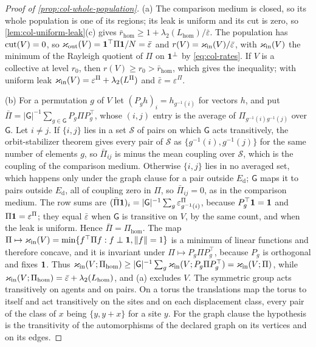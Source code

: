 \begin{proof}[Proof of \cref{prop:col-whole-population}]
(a) The comparison medium is closed, so its whole population is one of its regions; its leak is uniform and its cut is zero, so \cref{lem:col-uniform-leak}(c) gives $\bar r_{\mathrm{hom}}\ge1+\lambda_2(L_{\mathrm{hom}})/\bar\varepsilon$. The population has $\operatorname{cut}(V)=0$, so $\varkappa_{\mathrm{out}}(V)=\mathbf{1}^\top\Pi\mathbf{1}/N=\bar\varepsilon$ and $r(V)=\varkappa_{\mathrm{in}}(V)/\bar\varepsilon$, with $\varkappa_{\mathrm{in}}(V)$ the minimum of the Rayleigh quotient of $\Pi$ on $\mathbf{1}^\perp$ by \eqref{eq:col-rates}. If $V$ is a collective at level $r_0$, then $r(V)\ge r_0>\bar r_{\mathrm{hom}}$, which gives the inequality; with uniform leak $\varkappa_{\mathrm{in}}(V)=\varepsilon^\Pi+\lambda_2(L^\Pi)$ and $\bar\varepsilon=\varepsilon^\Pi$.

(b) For a permutation $g$ of $V$ let $(P_gh)_i=h_{g^{-1}(i)}$ for vectors $h$, and put $\bar\Pi=|\mathsf G|^{-1}\sum_{g\in\mathsf G}P_g\Pi P_g^\top$, whose $(i,j)$ entry is the average of $\Pi_{g^{-1}(i)g^{-1}(j)}$ over $\mathsf G$. Let $i\neq j$. If $\{i,j\}$ lies in a set $\mathcal S$ of pairs on which $\mathsf G$ acts transitively, the orbit-stabilizer theorem gives every pair of $\mathcal S$ as $\{g^{-1}(i),g^{-1}(j)\}$ for the same number of elements $g$, so $\bar\Pi_{ij}$ is minus the mean coupling over $\mathcal S$, which is the coupling of the comparison medium. Otherwise $\{i,j\}$ lies in no averaged set, which happens only under the graph clause for a pair outside $E_{\mathrm d}$; $\mathsf G$ maps it to pairs outside $E_{\mathrm d}$, all of coupling zero in $\Pi$, so $\bar\Pi_{ij}=0$, as in the comparison medium. The row sums are $(\bar\Pi\mathbf{1})_i=|\mathsf G|^{-1}\sum_g\varepsilon^\Pi_{g^{-1}(i)}$, because $P_g^\top\mathbf{1}=\mathbf{1}$ and $\Pi\mathbf{1}=\varepsilon^\Pi$; they equal $\bar\varepsilon$ when $\mathsf G$ is transitive on $V$, by the same count, and when the leak is uniform. Hence $\bar\Pi=\Pi_{\mathrm{hom}}$. The map $\Pi\mapsto\varkappa_{\mathrm{in}}(V)=\min\{f^\top\Pi f:f\perp\mathbf{1},\Vert f\Vert=1\}$ is a minimum of linear functions and therefore concave, and it is invariant under $\Pi\mapsto P_g\Pi P_g^\top$, because $P_g$ is orthogonal and fixes $\mathbf{1}$. Thus $\varkappa_{\mathrm{in}}(V;\Pi_{\mathrm{hom}})\ge|\mathsf G|^{-1}\sum_g\varkappa_{\mathrm{in}}(V;P_g\Pi P_g^\top)=\varkappa_{\mathrm{in}}(V;\Pi)$, while $\varkappa_{\mathrm{in}}(V;\Pi_{\mathrm{hom}})=\bar\varepsilon+\lambda_2(L_{\mathrm{hom}})$, and (a) excludes $V$. The symmetric group acts transitively on agents and on pairs. On a torus the translations map the torus to itself and act transitively on the sites and on each displacement class, every pair of the class of $x$ being $\{y,y+x\}$ for a site $y$. For the graph clause the hypothesis is the transitivity of the automorphisms of the declared graph on its vertices and on its edges.


\end{proof}
